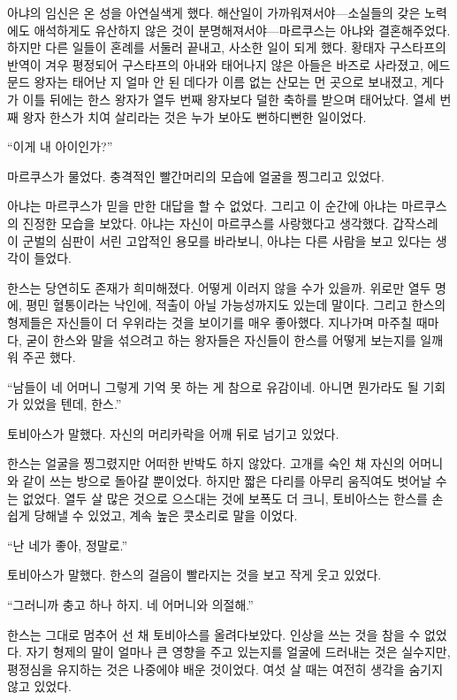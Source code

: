 아냐의 임신은 온 성을 아연실색게 했다. 해산일이 가까워져서야—소실들의 갖은 노력에도 애석하게도 유산하지 않은 것이 분명해져서야—마르쿠스는 아냐와 결혼해주었다. 하지만 다른 일들이 혼례를 서둘러 끝내고, 사소한 일이 되게 했다. 황태자 구스타프의 반역이 겨우 평정되어 구스타프의 아내와 태어나지 않은 아들은 바즈로 사라졌고, 에드문드 왕자는 태어난 지 얼마 안 된 데다가 이름 없는 산모는 먼 곳으로 보내졌고, 게다가 이틀 뒤에는 한스 왕자가 열두 번째 왕자보다 덜한 축하를 받으며 태어났다. 열세 번째 왕자 한스가 치여 살리라는 것은 누가 보아도 뻔하디뻔한 일이었다.

``이게 내 아이인가?''

마르쿠스가 물었다. 충격적인 빨간머리의 모습에 얼굴을 찡그리고 있었다.

아냐는 마르쿠스가 믿을 만한 대답을 할 수 없었다. 그리고 이 순간에 아냐는 마르쿠스의 진정한 모습을 보았다. 아냐는 자신이 마르쿠스를 사랑했다고 생각했다. 갑작스레 이 군벌의 심판이 서린 고압적인 용모를 바라보니, 아냐는 다른 사람을 보고 있다는 생각이 들었다.

\textbreak

한스는 당연히도 존재가 희미해졌다. 어떻게 이러지 않을 수가 있을까. 위로만 열두 명에, 평민 혈통이라는 낙인에, 적출이 아닐 가능성까지도 있는데 말이다. 그리고 한스의 형제들은 자신들이 더 우위라는 것을 보이기를 매우 좋아했다. 지나가며 마주칠 때마다, 굳이 한스와 말을 섞으려고 하는 왕자들은 자신들이 한스를 어떻게 보는지를 일깨워 주곤 했다.

``남들이 네 어머니 그렇게 기억 못 하는 게 참으로 유감이네. 아니면 뭔가라도 될 기회가 있었을 텐데, 한스.''

토비아스가 말했다. 자신의 머리카락을 어깨 뒤로 넘기고 있었다.

한스는 얼굴을 찡그렸지만 어떠한 반박도 하지 않았다. 고개를 숙인 채 자신의 어머니와 같이 쓰는 방으로 돌아갈 뿐이었다. 하지만 짧은 다리를 아무리 움직여도 벗어날 수는 없었다. 열두 살 많은 것으로 으스대는 것에 보폭도 더 크니, 토비아스는 한스를 손쉽게 당해낼 수 있었고, 계속 높은 콧소리로 말을 이었다.

``난 네가 좋아, 정말로.''

토비아스가 말했다. 한스의 걸음이 빨라지는 것을 보고 작게 웃고 있었다.

``그러니까 충고 하나 하지. 네 어머니와 의절해.''

한스는 그대로 멈추어 선 채 토비아스를 올려다보았다. 인상을 쓰는 것을 참을 수 없었다. 자기 형제의 말이 얼마나 큰 영향을 주고 있는지를 얼굴에 드러내는 것은 실수지만, 평정심을 유지하는 것은 나중에야 배운 것이었다. 여섯 살 때는 여전히 생각을 숨기지 않고 있었다.

